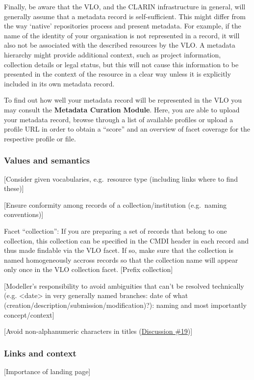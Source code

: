 Finally, be aware that the VLO, and the CLARIN infrastructure in
general, will generally assume that a metadata record is
self-sufficient. This might differ from the way `native' repositories
process and present metadata. For example, if the name of the identity
of your organisation is not represented in a record, it will also not be
associated with the described resources by the VLO. A metadata hierarchy
might provide additional context, such as project information,
collection details or legal status, but this will not cause this
information to be presented in the context of the resource in a clear
way unless it is explicitly included in its own metadata record.

To find out how well your metadata record will be represented in the VLO
you may consult the \textbf{Metadata Curation Module}. Here, you are
able to upload your metadata record, browse through a list of available
profiles or upload a profile URL in order to obtain a ``score'' and an
overview of facet coverage for the respective profile or file.

\subsubsection{Values and semantics}\label{values-and-semantics}

{[}Consider given vocabularies, e.g.~resource type (including links
where to find these){]}

{[}Ensure conformity among records of a collection/institution
(e.g.~naming conventions){]}

Facet ``collection'': If you are preparing a set of records that belong
to one collection, this collection can be specified in the CMDI header
in each record and thus made findable via the VLO facet. If so, make
sure that the collection is named homogeneously accross records so that
the collection name will appear only once in the VLO collection facet.
{[}Prefix collection{]}

{[}Modeller's responsibility to avoid ambiguities that can't be resolved
technically (e.g. \textless{}date\textgreater{} in very generally named
branches: date of what (creation/description/submission/modification)?):
naming and most importantly concept/context{]}

{[}Avoid non-alphanumeric characters in titles
(\href{https://www.gitbook.com/book/cmdi-taskforce/cmdi-best-practices/discussions/19}{Discussion
\#19}){]}

\subsubsection{Links and context}\label{links-and-context}

{[}Importance of landing page{]}
